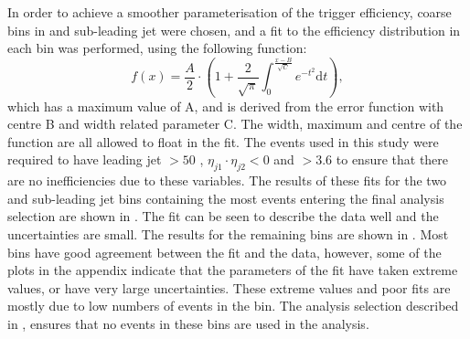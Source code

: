 In order to achieve a smoother parameterisation of the trigger efficiency, coarse bins in \Mjj and sub-leading jet \pt were chosen, and a fit to the \METnoMU efficiency distribution in each bin was performed, using the following function:
\begin{equation}
  \label{eq:parkedtrigfunc}
  f\left(x\right)=\frac{A}{2}\cdot\left(1+ \frac{2}{\sqrt{\pi}}\int_{0}^{\frac{x-B}{\sqrt{C}}}e^{-t^{2}}\mathrm{d}t\right),
\end{equation}
which has a maximum value of A, and is derived from the error function with centre B and width related parameter C. The width, maximum and centre of the function are all allowed to float in the fit. The events used in this study were required to have leading jet \pt$>50$ \GeV, $\eta_{j1}\cdot\eta_{j2}<0$ and \detajj$>3.6$ to ensure that there are no inefficiencies due to these variables. The results of these fits for the two \Mjj and sub-leading jet \pt bins containing the most events entering the final analysis selection are shown in . The fit can be seen to describe the data well and the uncertainties are small. The results for the remaining bins are shown in . Most bins have good agreement between the fit and the data, however, some of the plots in the appendix indicate that the parameters of the fit have taken extreme values, or have very large uncertainties. These extreme values and poor fits are mostly due to low numbers of events in the bin. The analysis selection described in , ensures that no events in these bins are used in the analysis.

